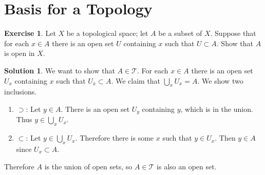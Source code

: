 \documentclass[12pt]{article}
\theoremstyle{plain}
\theoremstyle{definition}
\newtheorem*{solution}{\color{Goldenrod}Solution}
\newtheorem{exercise}{\color{YellowOrange}Exercise}[section]
\newcommand{\1}{\mathbbm 1}
\newcommand{\tT}{\mathcal T}
\begin{document}
\section{Basis for a Topology}

\begin{exercise}
	Let $X$ be a topological space; let $A$ be a subset of $X$. Suppose that for each $x \in A$ there is an open set $U$ containing $x$ such that $U \subset A$. Show that $A$ is open in $X$.
\end{exercise}
\begin{solution}
	We want to show that $A \in \tT$. For each $x \in A$ there is an open set $U_x$ containing $x$ such that $U_x \subset A$. We claim that $\bigcup_x U_x = A$. We show two inclusions. 
	\begin{enumerate}
		\item $\supset$: Let $y \in A$. There is an open set $U_y$ containing $y$, which is in the union. Thus $y \in \bigcup_x U_x$. 
		\item $\subset$: Let $y \in \bigcup_x U_x$. Therefore there is some $x$ such that $y \in U_x$. Then $y \in A$ since $U_x \subset A$.
	\end{enumerate}
	Therefore $A$ is the union of open sets, so $A \in \tT$ is also an open set.
\end{solution}
\end{document}
